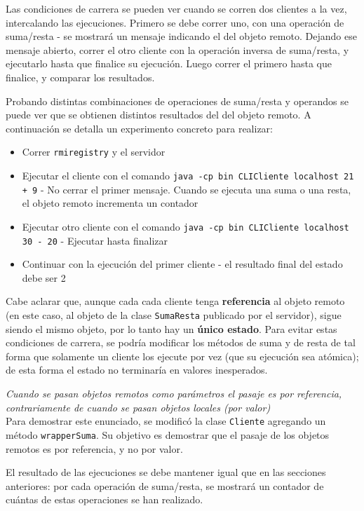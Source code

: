 Las condiciones de carrera se pueden ver cuando se corren dos clientes a la vez, intercalando las ejecuciones. Primero se debe correr uno, con una operación de suma/resta - se mostrará un mensaje indicando el  del objeto remoto. Dejando ese mensaje abierto, correr el otro cliente con la operación inversa de suma/resta, y ejecutarlo hasta que finalice su ejecución. Luego correr el primero hasta que finalice, y comparar los resultados.

Probando distintas combinaciones de operaciones de suma/resta y operandos se puede ver que se obtienen distintos resultados del  del objeto remoto. A continuación se detalla un experimento concreto para realizar:

\begin{itemize}
    \item Correr \texttt{rmiregistry} y el servidor 
    \item Ejecutar el cliente con el comando \texttt{java -cp bin CLICliente localhost 21 + 9} - No cerrar el primer mensaje. Cuando se ejecuta una suma o una resta, el objeto remoto incrementa un contador
    \item Ejecutar otro cliente con el comando \texttt{java -cp bin CLICliente localhost 30 - 20} - Ejecutar hasta finalizar
    \item Continuar con la ejecución del primer cliente - el resultado final del estado debe ser 2
\end{itemize}

Cabe aclarar que, aunque cada cada cliente tenga \textbf{referencia} al objeto remoto (en este caso, al objeto de la clase \texttt{SumaResta} publicado por el servidor), sigue siendo el mismo objeto, por lo tanto hay un \textbf{único estado}. Para evitar estas condiciones de carrera, se podría modificar los métodos de suma y de resta de tal forma que solamente un cliente los ejecute por vez (que su ejecución sea atómica); de esta forma el estado no terminaría en valores inesperados.  

\emph{Cuando se pasan objetos remotos como parámetros el pasaje es por referencia, contrariamente de cuando se pasan objetos locales (por valor)} 
~\\

Para demostrar este enunciado, se modificó la clase \texttt{Cliente} agregando un método \texttt{wrapperSuma}. Su objetivo es demostrar que el pasaje de los objetos remotos es por referencia, y no por valor.

El resultado de las ejecuciones se debe mantener igual que en las secciones anteriores: por cada operación de suma/resta, se mostrará un contador de cuántas de estas operaciones se han realizado.

